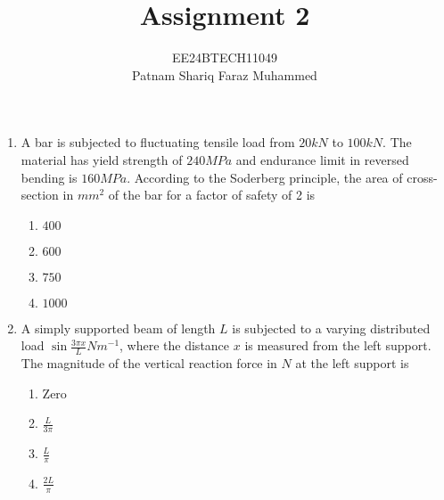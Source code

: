 \documentclass[journal]{IEEEtran}
\numberwithin{equation}{enumi}
\numberwithin{figure}{enumi}
\begin{document}


\title{Assignment 2}
\author{EE24BTECH11049 \\ Patnam Shariq Faraz Muhammed}

{\let\newpage\relax\maketitle}

\begin{enumerate}

    \item 
    A bar is subjected to fluctuating tensile load from $20 kN$ to $100 kN$. The material has yield strength of $240 MPa$ and endurance limit in reversed bending is $160 MPa$. According to the Soderberg principle, the area of cross-section in $mm^2$ of the bar for a factor of safety of 2 is
    \hfill{}
    \begin{multicols}{4}
        \begin{enumerate}
            \item $400$
            \item $600$
            \item $750$
            \item $1000$
        \end{enumerate}
    \end{multicols}

    \item 
    A simply supported beam of length $L$ is subjected to a varying distributed load $\sin{\frac{3\pi x}{L}} Nm^{-1}$, where the distance $x$ is measured from the left support. The magnitude of the vertical reaction force in $N$ at the left support is
    \hfill{}

    \begin{multicols}{4}
        \begin{enumerate}
            \item Zero
            \item $\frac{L}{3\pi}$
            \item $\frac{L}{\pi}$
            \item $\frac{2L}{\pi}$
        \end{enumerate}
    \end{multicols}


\end{enumerate}
\end{document}
